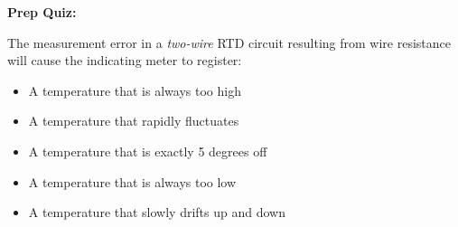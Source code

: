 \noindent
{\bf Prep Quiz:}

The measurement error in a {\it two-wire} RTD circuit resulting from wire resistance will cause the indicating meter to register:

\begin{itemize}
\item{} A temperature that is always too high
\vskip 5pt 
\item{} A temperature that rapidly fluctuates
\vskip 5pt 
\item{} A temperature that is exactly 5 degrees off
\vskip 5pt 
\item{} A temperature that is always too low
\vskip 5pt 
\item{} A temperature that slowly drifts up and down
\end{itemize}




